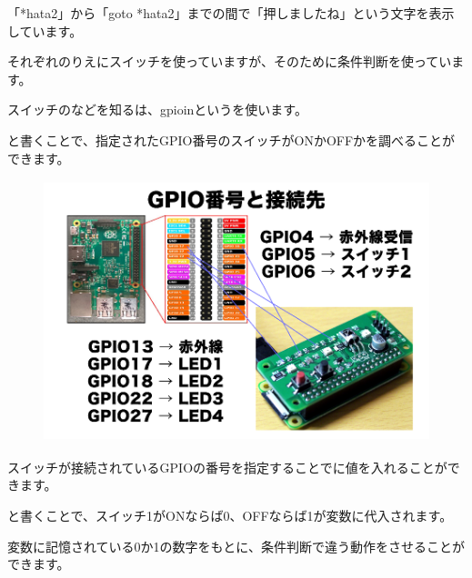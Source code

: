 「*hata2」から「goto *hata2」までの間で「押しましたね」という文字を表示しています。

それぞれのりえにスイッチを使っていますが、そのために条件判断を使っています。

スイッチのなどを知るは、gpioinというを使います。



\begin{description}
    \item {}
\end{description}

と書くことで、指定されたGPIO番号のスイッチがONかOFFかを調べることができます。



\begin{figure}[H]
    \begin{center}
      \includegraphics[keepaspectratio,width=12.409cm,height=7.62cm]{text04-img/text04-img004.png}
    \end{center}
    \label{fig:prog_menu}
\end{figure}



スイッチが接続されているGPIOの番号を指定することでに値を入れることができます。

\begin{description}
    \item {}
\end{description}



と書くことで、スイッチ1がONならば0、OFFならば1が変数に代入されます。

変数に記憶されている0か1の数字をもとに、条件判断で違う動作をさせることができます。


